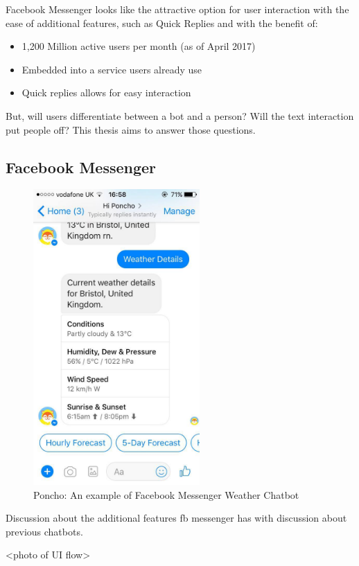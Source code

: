 Facebook Messenger looks like the attractive option for user interaction with the ease of additional features, such as Quick Replies and with the benefit of:

\begin{itemize}
  \item 1,200 Million active users per month (as of April 2017)~\cite{fb_messenger_stats}
  \item Embedded into a service users already use
  \item Quick replies allows for easy interaction
\end{itemize}

But, will users differentiate between a bot and a person? Will the text interaction put people off? This thesis aims to answer those questions.

\subsection{Facebook Messenger}

\begin{figure}[H] %
    \centering
    \includegraphics[width=2.5in]{../resources/existing-bots/poncho.jpg}
    \caption{Poncho: An example of Facebook Messenger Weather Chatbot}
    \label{fig:poncho}
\end{figure}

Discussion about the additional features fb messenger has with discussion about previous chatbots.

<photo of UI flow>

